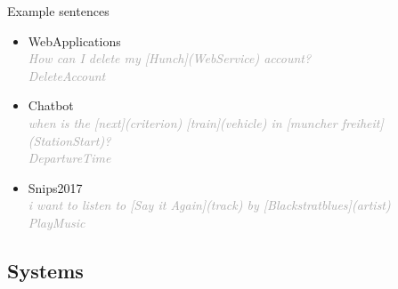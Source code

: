 \documentclass[pdf]{beamer}
\newcommand{\entity}[1]{\textcolor{ao(english)}{#1}}
\newcommand{\intent}[1]{\textcolor{azure(colorwheel)}{#1}}
\newcommand{\demo}[1]{\textit{\textcolor{darkgray}{#1}}}
\begin{document}
    \begin{frame}{Example sentences}
        \begin{itemize}
            \item WebApplications\\
            \demo{How can I delete my [Hunch](\entity{WebService}) account?} \\
            \demo{\intent{DeleteAccount}}
            \item Chatbot \\
            \demo{when is the [next](\entity{criterion}) [train](\entity{vehicle}) in
            [muncher freiheit](\entity{StationStart})?} \\
            \demo{\intent{DepartureTime}}
            \item Snips2017 \\
            \demo{i want to listen to [Say it Again](\entity{track}) by
            [Blackstratblues](\entity{artist})} \\
            \demo{\intent{PlayMusic}}
        \end{itemize}
    \end{frame}

    \subsection{Systems}
\end{document}
